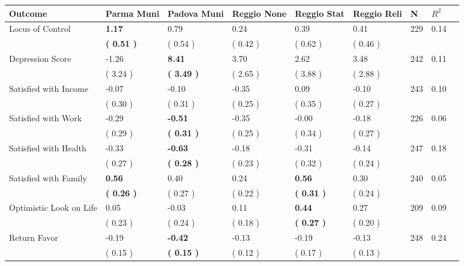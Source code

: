 \begin{tabular}{L{6.2cm} C{1.8cm} C{1.8cm} C{1.8cm} C{1.8cm} C{1.8cm} C{1.8cm} C{0.3cm} C{0.3cm}}
\toprule
 \textbf{Outcome} & \textbf{Parma Muni} & \textbf{Padova Muni} & \textbf{Reggio None} & \textbf{Reggio Stat} & \textbf{Reggio Reli} & \textbf{N} & \textbf{$ R^2$} \\
\midrule
Locus of Control & \textbf{     1.17} &      0.79 &      0.24 &      0.39 &      0.41  & 229 &       0.14 \\ 
 & \textbf{(     0.51 )} & (     0.54 ) & (     0.42 ) & (     0.62 ) & (     0.46 )  & \\
Depression Score &     -1.26 & \textbf{     8.41} &      3.70 &      2.62 &      3.48  & 242 &       0.11 \\ 
 & (     3.24 ) & \textbf{(     3.49 )} & (     2.65 ) & (     3.88 ) & (     2.88 )  & \\
Satisfied with Income &     -0.07 &     -0.10 &     -0.35 &      0.09 &     -0.10  & 243 &       0.10 \\ 
 & (     0.30 ) & (     0.31 ) & (     0.25 ) & (     0.35 ) & (     0.27 )  & \\
Satisfied with Work &     -0.29 & \textbf{    -0.51} &     -0.35 &     -0.00 &     -0.18  & 226 &       0.06 \\ 
 & (     0.29 ) & \textbf{(     0.31 )} & (     0.25 ) & (     0.34 ) & (     0.27 )  & \\
Satisfied with Health &     -0.33 & \textbf{    -0.63} &     -0.18 &     -0.31 &     -0.14  & 247 &       0.18 \\ 
 & (     0.27 ) & \textbf{(     0.28 )} & (     0.23 ) & (     0.32 ) & (     0.24 )  & \\
Satisfied with Family & \textbf{     0.56} &      0.40 &      0.24 & \textbf{     0.56} &      0.30  & 240 &       0.05 \\ 
 & \textbf{(     0.26 )} & (     0.27 ) & (     0.22 ) & \textbf{(     0.31 )} & (     0.24 )  & \\
Optimistic Look on Life &      0.05 &     -0.03 &      0.11 & \textbf{     0.44} &      0.27  & 209 &       0.09 \\ 
 & (     0.23 ) & (     0.24 ) & (     0.18 ) & \textbf{(     0.27 )} & (     0.20 )  & \\
Return Favor &     -0.19 & \textbf{    -0.42} &     -0.13 &     -0.19 &     -0.13  & 248 &       0.24 \\ 
 & (     0.15 ) & \textbf{(     0.15 )} & (     0.12 ) & (     0.17 ) & (     0.13 )  & \\

\end{tabular}
